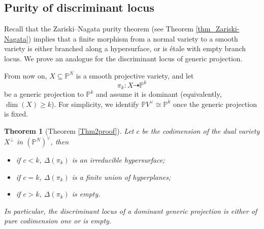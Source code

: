 \documentclass[12pt]{amsart}
\newtheorem{theorem}{Theorem}[section]
\begin{document}


\subsection{Purity of discriminant locus} Recall that the Zariski–Nagata purity theorem (see Theorem \ref{thm_Zariski-Nagata}) implies that a finite morphism from a normal variety to a smooth variety is either branched along a hypersurface, or is étale with empty branch locus. We prove an analogue for the discriminant locus of generic projection.

From now on, $X\subseteq \mathbb P^N$ is a smooth projective variety, and let \begin{equation}\label{intro_eqn_genproj}
    \pi_k:X\dashrightarrow \mathbb P^k
\end{equation} 
be a generic projection to $\mathbb P^k$ and assume it is dominant (equivalently, $\dim(X)\ge k$). For simplicity, we identify $\mathbb PV^{\vee}\cong \mathbb P^k$ once the generic projection is fixed.  %


\begin{theorem}[Theorem \ref{Thm2proof}]\label{thm_Dirreducible-hypersurface}
Let $c$ be the codimension of the dual variety $X^{\perp}$ in $(\mathbb P^N)^{\vee}$, then 
    \begin{itemize}
    \item[(i)] if $c<k$, $\Delta(\pi_k)$ is an irreducible hypersurface;
    \item[(ii)] if $c=k$, $\Delta(\pi_k)$ is a finite union of hyperplanes;
    \item[(iii)] if $c>k$, $\Delta(\pi_k)$ is empty.
    \end{itemize}
    In particular, the discriminant locus of a dominant generic projection is either of pure codimension one or is empty.
\end{theorem}
\end{document}
